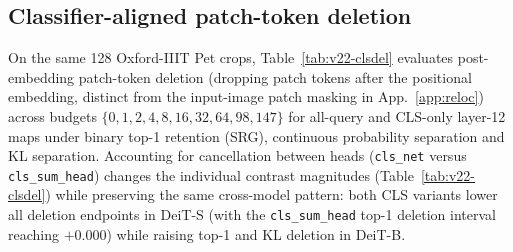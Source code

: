 \subsection{Classifier-aligned patch-token deletion}
On the same 128 Oxford-IIIT Pet crops, Table~\ref{tab:v22-clsdel} evaluates post-embedding patch-token deletion (dropping patch tokens after the positional embedding, distinct from the input-image patch masking in App.~\ref{app:reloc}) across budgets $\{0,1,2,4,8,16,32,64,98,147\}$ for all-query and CLS-only layer-12 maps under binary top-1 retention (SRG), continuous probability separation and KL separation. Accounting for cancellation between heads (\texttt{cls\_net} versus \texttt{cls\_sum\_head}) changes the individual contrast magnitudes (Table~\ref{tab:v22-clsdel}) while preserving the same cross-model pattern: both CLS variants lower all deletion endpoints in DeiT-S (with the \texttt{cls\_sum\_head} top-1 deletion interval reaching $+0.000$) while raising top-1 and KL deletion in DeiT-B.

\begin{table}[!htbp]
\caption{Exploratory layer-12 post-embedding patch-token deletion baselines (all-query $R_0$) and paired contrasts on 128 Oxford-IIIT Pet crops (95\% bootstrap CIs; 1,000 draws).}
\label{tab:v22-clsdel}
\centering\footnotesize\setlength{\tabcolsep}{3pt}
\resizebox{\linewidth}{!}{}
\end{table}

\clearpage
